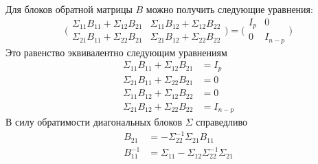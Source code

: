 \documentclass[a4paper]{article}
\begin{document}
Для блоков обратной матрицы $B$ можно получить следующие уравнения:
\[
\biggl(\begin{matrix}
	\Sigma_{11}B_{11} + \Sigma_{12}B_{21} & \Sigma_{11}B_{12} + \Sigma_{12}B_{22} \\
	\Sigma_{21}B_{11} + \Sigma_{22}B_{21} & \Sigma_{21}B_{12} + \Sigma_{22}B_{22}
\end{matrix}\biggr)
= \biggl(\begin{matrix}I_p & 0\\0 & I_{n-p}\end{matrix}\biggr)
\]
Это равенство эквивалентно следующим уравнениям
\begin{align*}
	\Sigma_{11}B_{11} + \Sigma_{12}B_{21} &= I_p \\
	\Sigma_{21}B_{11} + \Sigma_{22}B_{21} &= 0 \\
	\Sigma_{11}B_{12} + \Sigma_{12}B_{22} &= 0 \\
	\Sigma_{21}B_{12} + \Sigma_{22}B_{22} &= I_{n-p}
\end{align*}
В силу обратимости диагональных блоков $\Sigma$ справедливо
\begin{align*}
	B_{21} &= - \Sigma_{22}^{-1} \Sigma_{21}B_{11} \\
	B_{11}^{-1} &= \Sigma_{11} - \Sigma_{12} \Sigma_{22}^{-1} \Sigma_{21}
\end{align*}
\end{document}
